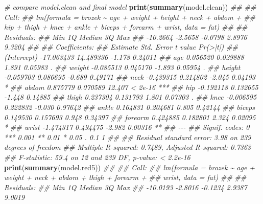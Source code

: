 \documentclass[
]{book}
\newenvironment{Shaded}{\begin{snugshade}}{\end{snugshade}}
\newcommand{\CommentTok}[1]{\textcolor[rgb]{0.56,0.35,0.01}{\textit{#1}}}
\newcommand{\KeywordTok}[1]{\textcolor[rgb]{0.13,0.29,0.53}{\textbf{#1}}}
\newcommand{\NormalTok}[1]{#1}
\theoremstyle{definition}
\theoremstyle{definition}
\theoremstyle{definition}
\theoremstyle{remark}
\begin{document}
\begin{Shaded}
\begin{Highlighting}[]
\CommentTok{\# compare model.clean and final model}
\KeywordTok{print}\NormalTok{(}\KeywordTok{summary}\NormalTok{(model.clean))}
\CommentTok{\#\# }
\CommentTok{\#\# Call:}
\CommentTok{\#\# lm(formula = brozek \textasciitilde{} age + weight + height + neck + abdom + }
\CommentTok{\#\#     hip + thigh + knee + ankle + biceps + forearm + wrist, data = fat)}
\CommentTok{\#\# }
\CommentTok{\#\# Residuals:}
\CommentTok{\#\#      Min       1Q   Median       3Q      Max }
\CommentTok{\#\# {-}10.2664  {-}2.5658  {-}0.0798   2.8976   9.3204 }
\CommentTok{\#\# }
\CommentTok{\#\# Coefficients:}
\CommentTok{\#\#               Estimate Std. Error t value Pr(\textgreater{}|t|)    }
\CommentTok{\#\# (Intercept) {-}17.063433  14.489336  {-}1.178  0.24011    }
\CommentTok{\#\# age           0.056520   0.029888   1.891  0.05983 .  }
\CommentTok{\#\# weight       {-}0.085513   0.045170  {-}1.893  0.05954 .  }
\CommentTok{\#\# height       {-}0.059703   0.086695  {-}0.689  0.49171    }
\CommentTok{\#\# neck         {-}0.439315   0.214802  {-}2.045  0.04193 *  }
\CommentTok{\#\# abdom         0.875779   0.070589  12.407  \textless{} 2e{-}16 ***}
\CommentTok{\#\# hip          {-}0.192118   0.132655  {-}1.448  0.14885    }
\CommentTok{\#\# thigh         0.237304   0.131793   1.801  0.07303 .  }
\CommentTok{\#\# knee         {-}0.006595   0.222832  {-}0.030  0.97642    }
\CommentTok{\#\# ankle         0.164831   0.204681   0.805  0.42144    }
\CommentTok{\#\# biceps        0.149530   0.157693   0.948  0.34397    }
\CommentTok{\#\# forearm       0.424885   0.182801   2.324  0.02095 *  }
\CommentTok{\#\# wrist        {-}1.474317   0.494475  {-}2.982  0.00316 ** }
\CommentTok{\#\# {-}{-}{-}}
\CommentTok{\#\# Signif. codes:  0 \textquotesingle{}***\textquotesingle{} 0.001 \textquotesingle{}**\textquotesingle{} 0.01 \textquotesingle{}*\textquotesingle{} 0.05 \textquotesingle{}.\textquotesingle{} 0.1 \textquotesingle{} \textquotesingle{} 1}
\CommentTok{\#\# }
\CommentTok{\#\# Residual standard error: 3.98 on 239 degrees of freedom}
\CommentTok{\#\# Multiple R{-}squared:  0.7489,	Adjusted R{-}squared:  0.7363 }
\CommentTok{\#\# F{-}statistic:  59.4 on 12 and 239 DF,  p{-}value: \textless{} 2.2e{-}16}
\KeywordTok{print}\NormalTok{(}\KeywordTok{summary}\NormalTok{(model.red5))}
\CommentTok{\#\# }
\CommentTok{\#\# Call:}
\CommentTok{\#\# lm(formula = brozek \textasciitilde{} age + weight + neck + abdom + thigh + forearm + }
\CommentTok{\#\#     wrist, data = fat)}
\CommentTok{\#\# }
\CommentTok{\#\# Residuals:}
\CommentTok{\#\#      Min       1Q   Median       3Q      Max }
\CommentTok{\#\# {-}10.0193  {-}2.8016  {-}0.1234   2.9387   9.0019 }

\end{Highlighting}
\end{Shaded}
\end{document}
